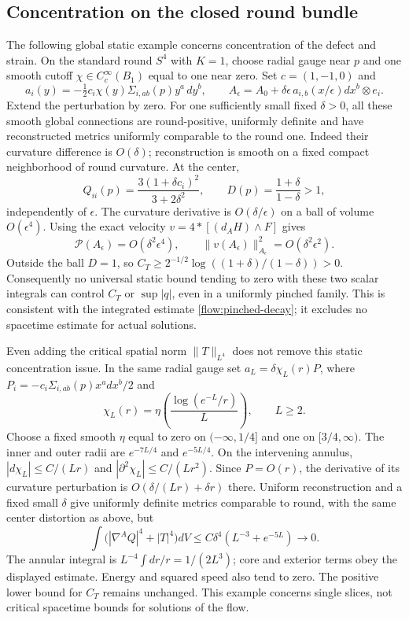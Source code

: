\documentclass[11pt]{article}
\numberwithin{equation}{section}
\theoremstyle{definition}
\theoremstyle{remark}
\begin{document}
\subsection{Concentration on the closed round bundle}
\label{subsec:closed-concentration}

The following global static example concerns concentration of the defect and strain.
On the standard round $S^4$ with $K=1$, choose radial gauge near $p$ and
one smooth cutoff $\chi\in C_c^\infty(B_1)$ equal to one near zero.
Set $c=(1,-1,0)$ and
\[
 a_i(y)=-\tfrac12c_i\chi(y)\Sigma_{i,ab}(p)y^a\,dy^b,
 \qquad A_\epsilon=A_0+\delta\epsilon\,a_{i,b}(x/\epsilon)dx^b\otimes e_i.
\]
Extend the perturbation by zero. For one sufficiently small fixed
$\delta>0$, all these smooth global connections are round-positive,
uniformly definite and have reconstructed metrics uniformly comparable
to the round one. Indeed their curvature difference is $O(\delta)$;
reconstruction is smooth on a fixed compact neighborhood of round curvature.
At the center,
\[
 Q_{ii}(p)=\frac{3(1+\delta c_i)^2}{3+2\delta^2},\qquad
 D(p)=\frac{1+\delta}{1-\delta}>1,
\]
independently of $\epsilon$. The curvature derivative is
$O(\delta/\epsilon)$ on a ball of volume $O(\epsilon^4)$.
Using the exact velocity $v=4*[(d_AH)\wedge F]$ gives
\[
 \mathcal P(A_\epsilon)=O(\delta^2\epsilon^4),\qquad
 \|v(A_\epsilon)\|_{A_\epsilon}^2=O(\delta^2\epsilon^2).
\]
Outside the ball $D=1$, so
$C_T\geq2^{-1/2}\log((1+\delta)/(1-\delta))>0$.
Consequently no universal static bound tending to zero with these two
scalar integrals can control $C_T$ or $\sup|q|$, even in a uniformly
pinched family. This is consistent with the integrated estimate
\eqref{flow:pinched-decay}; it excludes no spacetime estimate for actual
solutions.


Even adding the critical spatial norm $\|T\|_{L^4}$ does not remove this
static concentration issue. In the same radial gauge set
$a_L=\delta\chi_L(r)P$, where
$P_i=-c_i\Sigma_{i,ab}(p)x^a dx^b/2$ and
\[
 \chi_L(r)=\eta\left(\frac{\log(e^{-L}/r)}L\right),\qquad L\geq2.
\]
Choose a fixed smooth $\eta$ equal to zero on $(-\infty,1/4]$ and one
on $[3/4,\infty)$. The inner and outer radii are
$e^{-7L/4}$ and $e^{-5L/4}$. On the intervening annulus,
$|d\chi_L|\leq C/(Lr)$ and $|\partial^2\chi_L|\leq C/(Lr^2)$.
Since $P=O(r)$, the derivative of its curvature perturbation is
$O(\delta/(Lr)+\delta r)$ there. Uniform reconstruction and a fixed
small $\delta$ give uniformly definite metrics comparable to round,
with the same center distortion as above, but
\[
 \int\bigl(|\nabla^A Q|^4+|T|^4\bigr)dV
       \leq C\delta^4(L^{-3}+e^{-5L})\longrightarrow0.
\]
The annular integral is $L^{-4}\int dr/r=1/(2L^3)$; core and exterior
terms obey the displayed estimate. Energy and squared speed also tend
to zero. The positive lower bound for $C_T$ remains unchanged.
This example concerns single slices, not critical spacetime bounds for
solutions of the flow.
\end{document}
